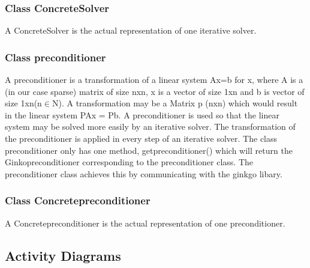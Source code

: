 \documentclass[parskip=full]{scrartcl}
\begin{document}
\subsubsection{Class ConcreteSolver}
A ConcreteSolver is the actual representation of one \gls{iterative solver}. 

\subsubsection{Class \gls{preconditioner}}
A \gls{preconditioner} is a transformation of a linear system Ax=b for x, where A is a (in our case sparse) matrix of size nxn, x is a vector of size 1xn and b is vector of size 1xn(n$\in$N). A transformation may be a Matrix p (nxn) which would result in the linear system PAx = Pb. A \gls{preconditioner} is used so that the linear system may be solved more easily by an \gls{iterative solver}. The transformation of the \gls{preconditioner} is applied in every step of an \gls{iterative solver}. \newline\newline
The class \gls{preconditioner} only has one method, get\gls{preconditioner}() which will return the Ginko\gls{preconditioner} corresponding to the \gls{preconditioner} class. The \gls{preconditioner} class achieves this by communicating with the ginkgo libary. 

\subsubsection{Class Concrete\gls{preconditioner}}
A Concrete\gls{preconditioner} is the actual representation of one \gls{preconditioner}.

\subsection{Activity Diagrams}
\end{document}
